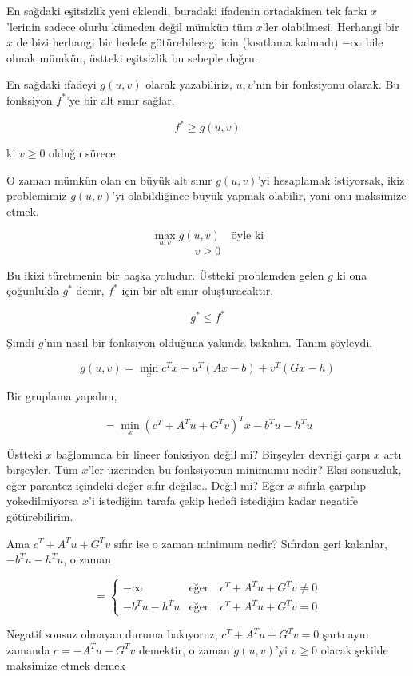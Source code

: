 \documentclass[12pt,fleqn]{article}\usepackage{../../common}
\begin{document}
En sağdaki eşitsizlik yeni eklendi, buradaki ifadenin ortadakinen tek farkı
$x$'lerinin sadece olurlu kümeden değil mümkün tüm $x$'ler
olabilmesi. Herhangi bir $x$ de bizi herhangi bir hedefe götürebilecegi
icin (kısıtlama kalmadı) $-\infty$ bile olmak mümkün, üstteki eşitsizlik bu
sebeple doğru.

En sağdaki ifadeyi $g(u,v)$ olarak yazabiliriz, $u,v$'nin bir
fonksiyonu olarak. Bu fonksiyon $f^*$'ye bir alt sınır sağlar, 

$$
f^* \ge g(u,v)
$$

ki $v \ge 0$ olduğu sürece. 

O zaman mümkün olan en büyük alt sınır $g(u,v)$'yi hesaplamak istiyorsak,
ikiz problemimiz $g(u,v)$'yi olabildiğince büyük yapmak olabilir, yani onu
maksimize etmek. 

$$
\max_{u,v} g(u,v) \quad \textrm{öyle ki}
$$
$$
v \ge 0
$$

Bu ikizi türetmenin bir başka yoludur. Üstteki problemden gelen $g$ ki ona
çoğunlukla $g^*$ denir, $f^*$ için bir alt sınır oluşturacaktır,

$$
g^* \le f^*
$$

Şimdi $g$'nin nasıl bir fonksiyon olduğuna yakında bakalım. Tanım şöyleydi,

$$
g(u,v) = \min_x c^T x + u^T (Ax-b) + v^T (Gx-h)
$$

Bir gruplama yapalım,

$$
= \min_x (c^T + A^Tu + G^T v)^T x - b^T u - h^Tu
$$

Üstteki $x$ bağlamında bir lineer fonksiyon değil mi? Birşeyler devriği
çarpı $x$ artı birşeyler. Tüm $x$'ler üzerinden bu fonksiyonun minimumu
nedir? Eksi sonsuzluk, eğer parantez içindeki değer sıfır değilse.. Değil
mi? Eğer $x$ sıfırla çarpılıp yokedilmiyorsa $x$'i istediğim tarafa çekip
hedefi istediğim kadar negatife götürebilirim.

Ama $c^T + A^Tu + G^T v$ sıfır ise o zaman minimum nedir? Sıfırdan geri
kalanlar, $- b^T u - h^Tu$, o zaman 

$$
= \left\{ \begin{array}{ll}
-\infty & \text{eğer} \quad c^T + A^Tu + G^T v \ne 0 \\
- b^T u - h^Tu & \text{eğer} \quad c^T + A^Tu + G^T v = 0 
\end{array} \right.
$$

Negatif sonsuz olmayan duruma bakıyoruz, $c^T + A^Tu + G^T v = 0 $ şartı
aynı zamanda $c = -A^Tu - G^T v $ demektir, o zaman $g(u,v)$'yi
$v \ge 0$ olacak şekilde maksimize etmek demek
\end{document}
